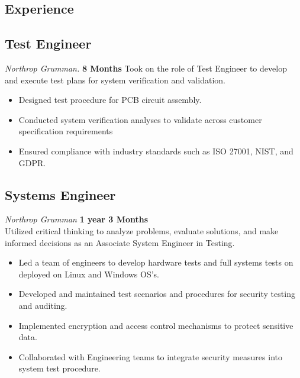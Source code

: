 \documentclass[letter,10pt]{article}
\begin{document}
\begin{paracol}{2}
\begin{leftcolumn}
\section*{Experience}

\subsection*{Test Engineer}
\textit{Northrop Grumman.} \hfill \textbf{8 Months}
Took on the role of Test Engineer to develop and execute test plans for system verification and validation. \\
\begin{itemize}[leftmargin=0.15in]
    \item Designed test procedure for PCB circuit assembly.
    \item Conducted system verification analyses to validate across customer specification requirements
    \item Ensured compliance with industry standards such as ISO 27001, NIST, and GDPR.
\end{itemize}

\subsection*{Systems Engineer}
\textit{Northrop Grumman} \hfill \textbf{1 year 3 Months}\\
Utilized critical thinking to analyze problems, evaluate solutions, and make informed decisions as an Associate System Engineer in Testing. \\
\begin{itemize}[leftmargin=0.15in]
    \item Led a team of engineers to develop hardware tests and full systems tests on deployed on Linux and Windows OS's.
    \item Developed and maintained test scenarios and procedures for security testing and auditing.
    \item Implemented encryption and access control mechanisms to protect sensitive data.
    \item Collaborated with Engineering teams to integrate security measures into system test procedure.
\end{itemize}


\end{leftcolumn}
\begin{rightcolumn}


\end{rightcolumn}
\end{paracol}
\end{document}
